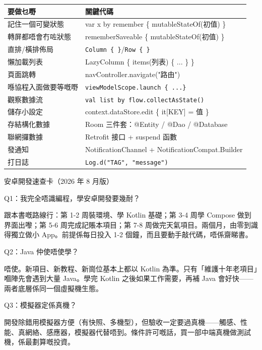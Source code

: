 


\begin{center}
\begin{tabularx}{\linewidth}{|X|X|}
\hline
\textbf{要做乜嘢} & \textbf{關鍵代碼} \tabularnewline
\hline
記住一個可變狀態 & var x by remember \{ mutableStateOf(初值) \} \tabularnewline
轉屏都唔會冇咗狀態 & rememberSaveable \{ mutableStateOf(初值) \} \tabularnewline
直排/橫排佈局 & \texttt{Column \{ \}}/\texttt{Row \{ \}} \tabularnewline
懶加載列表 & LazyColumn \{ items(列表) \{ ... \} \} \tabularnewline
頁面跳轉 & navController.navigate("路由") \tabularnewline
喺協程入面做要等嘅嘢 & \texttt{viewModelScope.\allowbreak launch \{ .\allowbreak .\allowbreak .\allowbreak  \}} \tabularnewline
觀察數據流 & \texttt{val list by flow.\allowbreak collectAsState()} \tabularnewline
儲存小設定 & context.dataStore.edit \{ it[KEY] = 值 \} \tabularnewline
存結構化數據 & Room 三件套：@Entity / @Dao / @Database \tabularnewline
聯網攞數據 & Retrofit 接口 + suspend 函數 \tabularnewline
發通知 & NotificationChannel + NotificationCompat.Builder \tabularnewline
打日誌 & \texttt{Log.\allowbreak d("TAG", "message")} \tabularnewline
\hline
\end{tabularx}
\end{center}

\begin{center}\small\color{gray}安卓開發速查卡（2026 年 8 月版）\end{center}


Q1：我完全唔識編程，學安卓開發要幾耐？

跟本書嘅路線行：第 1-2 周裝環境、學 Kotlin 基礎；第 3-4 周學 Compose 做到界面出嚟；第 5-6 周完成記賬本項目；第 7-8 周做完天氣項目。兩個月，由零到識得獨立做小 App。前提係每日投入 1-2 個鐘，而且要動手敲代碼，唔係齋睇書。

Q2：Java 仲使唔使學？

唔使。新項目、新教程、新崗位基本上都以 Kotlin 為準。只有「維護十年老項目」嗰陣先會遇到大量 Java。學完 Kotlin 之後如果工作需要，再補 Java 會好快——兩者底層係同一個虛擬機生態。

Q3：模擬器定係真機？

開發除錯用模擬器方便（有快照、多機型），但驗收一定要過真機——觸感、性能、真網絡、感應器，模擬器代替唔到。條件許可嘅話，買一部中端真機做測試機，係最劃算嘅投資。


